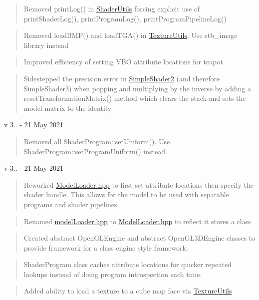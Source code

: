 \begin{quote}
Removed print\+Log() in \mbox{\hyperlink{namespace_shader_utils}{Shader\+Utils}} forcing explicit use of print\+Shader\+Log(), print\+Program\+Log(), print\+Program\+Pipeline\+Log() \end{quote}
\begin{quote}
Removed load\+BMP() and load\+TGA() in \mbox{\hyperlink{namespace_texture_utils}{Texture\+Utils}}. Use stb\+\_\+image library instead \end{quote}
\begin{quote}
Improved efficiency of setting VBO attribute locations for teapot \end{quote}
\begin{quote}
Sidestepped the precision error in \mbox{\hyperlink{namespace_simple_shader2}{Simple\+Shader2}} (and therefore Simple\+Shader3) when popping and multiplying by the inverse by adding a reset\+Transformation\+Matrix() method which clears the stack and sets the model matrix to the identity \end{quote}
v 3.. -\/ 21 May 2021 \begin{quote}
Removed all Shader\+Program\+::set\+Uniform(). Use Shader\+Program\+::set\+Program\+Uniform() instead. \end{quote}
v 3.. -\/ 21 May 2021 \begin{quote}
Reworked \mbox{\hyperlink{_model_loader_8hpp}{Model\+Loader.\+hpp}} to first set attribute locations then specify the shader handle. This allows for the model to be used with separable programs and shader pipelines. \end{quote}
\begin{quote}
Renamed \mbox{\hyperlink{_model_loader_8hpp}{model\+Loader.\+hpp}} to \mbox{\hyperlink{_model_loader_8hpp}{Model\+Loader.\+hpp}} to reflect it stores a class \end{quote}
\begin{quote}
Created abstract Open\+GLEngine and abstract Open\+GL3\+DEngine classes to provide framework for a class engine style framework. \end{quote}
\begin{quote}
Shader\+Program class caches attribute locations for quicker repeated lookups instead of doing program introspection each time. \end{quote}
\begin{quote}
Added ability to load a texture to a cube map face via \mbox{\hyperlink{namespace_texture_utils}{Texture\+Utils}} \end{quote}
